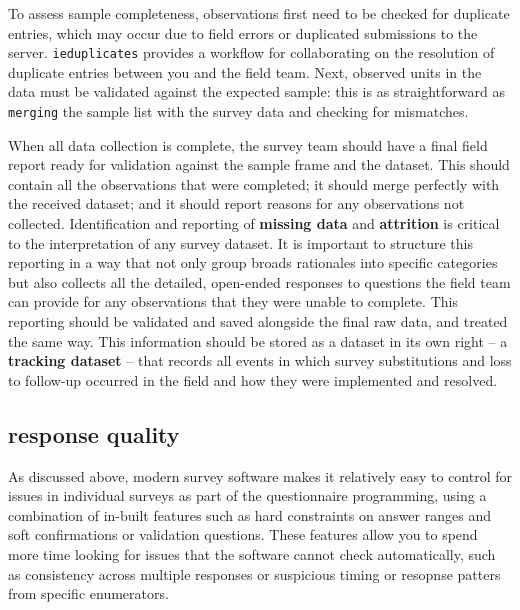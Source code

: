 To assess sample completeness, observations first need to be checked for duplicate entries, which may occur due to field errors or duplicated submissions to the server. 
\texttt{ieduplicates}
provides a workflow for collaborating on the resolution of duplicate entries between you and the field team.
Next, observed units in the data must be validated against the expected sample:
this is as straightforward as \texttt{merging} the sample list with the survey data and checking for mismatches.

When all data collection is complete, the survey team should have a final field report ready for validation against the sample frame and the dataset.
This should contain all the observations that were completed; it should merge perfectly with the received dataset; and it should report reasons for any observations not collected.
Identification and reporting of \textbf{missing data} and \textbf{attrition} is critical to the interpretation of any survey dataset.
It is important to structure this reporting in a way that not only group broads rationales into specific categories
but also collects all the detailed, open-ended responses to questions the field team can provide for any observations that they were unable to complete.
This reporting should be validated and saved alongside the final raw data, and treated the same way.
This information should be stored as a dataset in its own right -- a \textbf{tracking dataset} -- that records all events in which survey substitutions
and loss to follow-up occurred in the field and how they were implemented and resolved.


\subsection{response quality}
As discussed above, modern survey software makes it relatively easy to control for issues in individual surveys as part of the questionnaire programming, using a combination of in-built features such as hard constraints on answer ranges and soft confirmations or validation questions. These features allow you to spend more time looking for issues that the software cannot check automatically, such as consistency across multiple responses or suspicious timing or resopnse patters from specific enumerators. 



